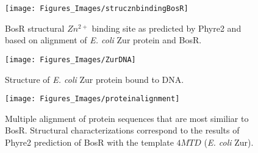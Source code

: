 \documentclass[12pt,twoside]{reedthesis}
\begin{document}
		 		 	\begin{figure}[h]
		 		 		
		 		 		\centering
		 		 		\texttt{[image: Figures\_Images/strucznbindingBosR]}
		 		 		\caption[BosR Structural $Zn^{2+}$ Binding Site]{BosR structural $Zn^{2+}$ binding site as predicted by Phyre2 and based on alignment of \textit{E. coli} Zur protein and BosR.}
		 		 		\label{StrucZnBosR}
		 		 	\end{figure}
		 		 	
		 		
		 \clearpage
		 			\begin{figure}[h!tbp]
		 				
		 				\centering
		 				\texttt{[image: Figures\_Images/ZurDNA]}
		 				\caption[Structure of \textit{E. coli} Zur Protein Bound to DNA]{Structure of \textit{E. coli} Zur protein bound to DNA.}
		 				\label{ZurDNA}
		 			\end{figure}
		 	\clearpage
		
		 
		 		 	\begin{figure}[h]
		 		 		
		 		 		\centering
		 		 		\texttt{[image: Figures\_Images/proteinalignment]}
		 		 		\caption[BosR Protein Multiple Alignment]{Multiple alignment of protein sequences that are most similiar to BosR. Structural characterizations correspond to the results of Phyre2 prediction of BosR with the template $4MTD$ (\textit{E. coli} Zur).}
		 		 		\label{Alignnment}
		 		 	\end{figure}
		 	 
\end{document}
